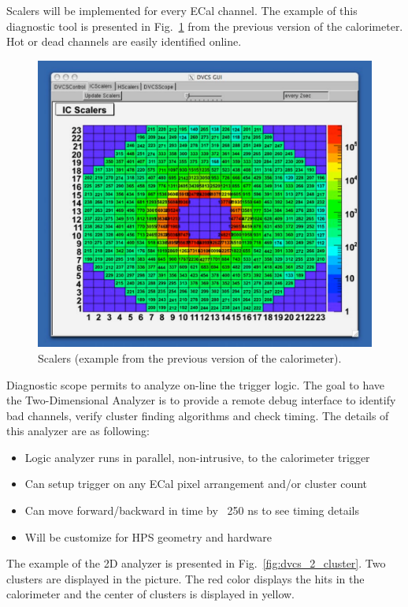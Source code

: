 Scalers will be implemented for every ECal channel. The example of this diagnostic tool is presented in Fig.~\ref{fig:dvcs_beam}
from the previous version of the calorimeter. Hot or dead channels are easily identified online.
\begin{figure}[h]
\includegraphics[scale=0.6]{daq_trigger/figures/dvcs_beam}
\caption{\small{Scalers (example from the previous version of the calorimeter).}}
\label{fig:dvcs_beam}
\end{figure}
Diagnostic scope permits to analyze on-line  the trigger logic. The goal to have  the Two-Dimensional Analyzer
 is to provide a remote debug interface to identify bad channels, verify cluster finding algorithms and check timing.
 The details of this analyzer are as following:
 
\begin{itemize}
\item Logic analyzer runs in parallel, non-intrusive, to the calorimeter trigger
\item Can setup trigger on any ECal pixel arrangement and/or cluster count
\item Can move forward/backward in time by ~250 ns to see timing details
\item Will be customize for HPS geometry and hardware
\end{itemize}

The example of the 2D analyzer is presented in Fig.~\ref{fig:dvcs_2_cluster}. Two clusters are displayed
in the picture. The red color displays the hits in the calorimeter and  the center of clusters is displayed in yellow.

